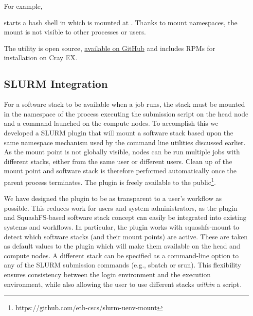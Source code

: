 For example,



starts a bash shell in which  is mounted at .
Thanks to mount namespaces, the mount is not visible to other processes or users.

The utility is open source, \href{https://github.com/eth-cscs/squashfs-mount}{available on GitHub} and includes RPMs for installation on Cray EX.

\subsection{SLURM Integration}


For a software stack to be available when a job runs, the stack must be mounted in the namespace of the process executing the submission script on the head node and a command launched on the compute nodes.
To accomplish this we developed a SLURM plugin that will mount a software stack based upon the same namespace mechanism used by the command line utilities discussed earlier.
As the mount point is not globally visible, nodes can be run multiple jobs with different stacks, either from the same user or different users.
Clean up of the mount point and software stack is therefore performed automatically once the parent process terminates.
The plugin is freely available to the public\footnote{https://github.com/eth-cscs/slurm-uenv-mount}.

We have designed the plugin to be as transparent to a user's workflow as possible.
This reduces work for users and system administrators, as the plugin and SquashFS-based software stack concept can easily be integrated into existing systems and workflows.
In particular, the plugin works with squashfs-mount to detect which software stacks (and their mount points) are active.
These are taken as default values to the plugin which will make them available on the head and compute nodes.
A different stack can be specified as a command-line option to any of the SLURM submission commands (e.g., sbatch or srun).
This flexibility ensures consistency between the login environment and the execution environment, while also allowing the user to use different stacks \emph{within} a script.


